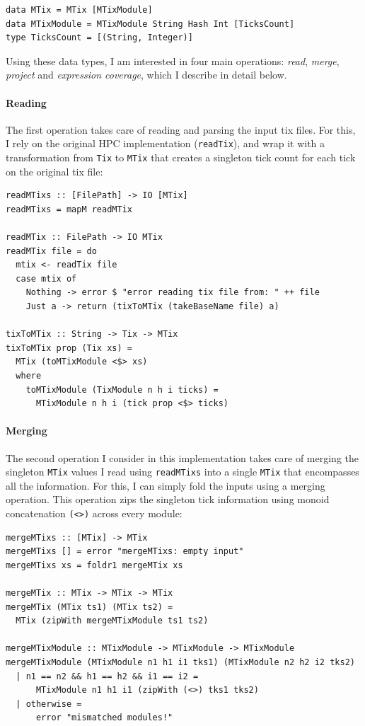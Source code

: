 \documentclass[a4paper,10pt]{article}
\begin{document}
\begin{verbatim}
data MTix = MTix [MTixModule]
data MTixModule = MTixModule String Hash Int [TicksCount]
type TicksCount = [(String, Integer)]
\end{verbatim}

Using these data types, I am interested in four main operations: \textit{read},
\textit{merge}, \textit{project} and \textit{expression coverage}, which I
describe in detail below.

\paragraph{Reading}

The first operation takes care of reading and parsing the input tix files. For
this, I rely on the original HPC implementation (\texttt{readTix}), and wrap it
with a transformation from \texttt{Tix} to \texttt{MTix} that creates a
singleton tick count for each tick on the original tix file:

\begin{verbatim}
readMTixs :: [FilePath] -> IO [MTix]
readMTixs = mapM readMTix

readMTix :: FilePath -> IO MTix
readMTix file = do
  mtix <- readTix file
  case mtix of
    Nothing -> error $ "error reading tix file from: " ++ file
    Just a -> return (tixToMTix (takeBaseName file) a)

tixToMTix :: String -> Tix -> MTix
tixToMTix prop (Tix xs) =
  MTix (toMTixModule <$> xs)
  where
    toMTixModule (TixModule n h i ticks) =
      MTixModule n h i (tick prop <$> ticks)
\end{verbatim}

\paragraph{Merging}

The second operation I consider in this implementation takes care of merging the
singleton \texttt{MTix} values I read using \texttt{readMTixs} into a single
\texttt{MTix} that encompasses all the information.
%
For this, I can simply fold the inputs using a merging operation.
%
This operation zips the singleton tick information using monoid concatenation
\texttt{(<>)} across every module:

\begin{verbatim}
mergeMTixs :: [MTix] -> MTix
mergeMTixs [] = error "mergeMTixs: empty input"
mergeMTixs xs = foldr1 mergeMTix xs

mergeMTix :: MTix -> MTix -> MTix
mergeMTix (MTix ts1) (MTix ts2) =
  MTix (zipWith mergeMTixModule ts1 ts2)

mergeMTixModule :: MTixModule -> MTixModule -> MTixModule
mergeMTixModule (MTixModule n1 h1 i1 tks1) (MTixModule n2 h2 i2 tks2)
  | n1 == n2 && h1 == h2 && i1 == i2 =
      MTixModule n1 h1 i1 (zipWith (<>) tks1 tks2)
  | otherwise =
      error "mismatched modules!"
\end{verbatim}
\end{document}
